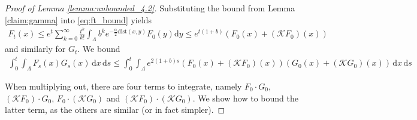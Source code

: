 \documentclass[10pt]{amsart}
\theoremstyle{definition}
\theoremstyle{remark}
\newcommand{\dist}{\mathrm{dist}}
\newcommand{\region}{\Lambda}
\newcommand{\diff}{\mathrm{d}}
\begin{document}
	\begin{proof}[Proof of Lemma \ref{lemma:unbounded_4.2}]
		Substituting the bound from Lemma \ref{claim:gamma} into \eqref{eq:ft_bound} yields
		\begin{align}
			F_t(x) \le e^t \sum_{k = 0}^{\infty} \frac{t^k}{k!} \int_{\region} b^k e^{- \frac{\alpha}{2}  \dist(x, y)} F_0(y) \diff y
			\leq e^{t  (1 + b)}(F_0(x) + (\mathcal{K}F_0)(x)) \label{eq:F-diffuse}
		\end{align}  
		and similarly for $G_t$.  We bound \begin{align*}
			\int_0^t \int_\Lambda F_s(x) G_s(x) \,\diff x \,\diff s \leq \int_0^t \int_\Lambda  e^{2(1 + b)s} (F_0(x) + (\mathcal{K} F_0)(x))(G_0(x) + (\mathcal{K} G_0)(x))\, \diff x \,\diff s
		\end{align*}
		
		When multiplying out, there are four terms to integrate, namely $F_0 \cdot G_0$, $(\mathcal{K} F_0)\cdot G_0$, $F_0 \cdot (\mathcal{K} G_0)$ and $(\mathcal{K} F_0) \cdot (\mathcal{K} G_0)$.  We show how to bound the latter term, as the others are similar (or in fact simpler).
		

\end{proof}
\end{document}
